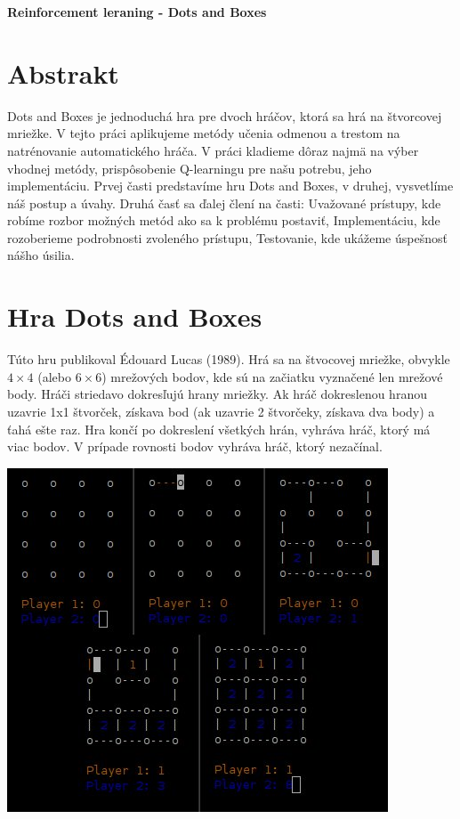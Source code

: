 \documentclass[10pt,a4paper]{article}
\begin{document}
\centerline{\Huge \bf Reinforcement leraning - Dots and Boxes}

\section*{Abstrakt}
Dots and Boxes je jednoduchá hra pre dvoch hráčov, ktorá sa hrá na štvorcovej mriežke.
V tejto práci aplikujeme metódy učenia odmenou a trestom na natrénovanie automatického hráča. 
V práci kladieme dôraz najmä na výber vhodnej metódy, prispôsobenie Q-learningu pre našu potrebu, jeho implementáciu.
Prvej časti predstavíme hru Dots and Boxes, v druhej, vysvetlíme náš postup a úvahy.
Druhá časť sa ďalej člení na časti: Uvažované prístupy, kde robíme rozbor možných metód ako sa k problému postaviť,
Implementáciu, kde rozoberieme podrobnosti zvoleného prístupu, Testovanie, kde ukážeme úspešnosť nášho úsilia.



\section{Hra Dots and Boxes}
Túto hru publikoval Édouard Lucas (1989). Hrá sa na štvocovej mriežke, obvykle $4\times 4$ (alebo $6\times 6$) mrežových bodov, kde sú na začiatku vyznačené len mrežové body.
Hráči striedavo dokresľujú hrany mriežky. Ak hráč dokreslenou hranou uzavrie 1x1 štvorček, získava bod (ak uzavrie 2 štvorčeky, získava dva body)
a ťahá ešte raz. Hra končí po dokreslení všetkých hrán, vyhráva hráč, ktorý má viac bodov. V prípade rovnosti bodov vyhráva hráč, ktorý nezačínal. 

\bigskip

\includegraphics[trim = -40mm 0 0 0, clip, scale=.5]{game1.jpg}
\end{document}
